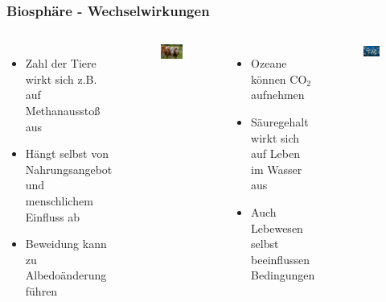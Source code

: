 \begin{frame}
	\frametitle{Biosphäre - Wechselwirkungen}
	\begin{columns}
			\begin{itemize}
				\item Zahl der Tiere wirkt sich z.B. auf Methanausstoß aus
				\item Hängt selbst von Nahrungsangebot und menschlichem Einfluss ab
				\item Beweidung kann zu Albedoänderung führen
			\end{itemize}
			\begin{figure}
				\centering
				\includegraphics[width=\linewidth]{bilder/kuehe}
			\end{figure}
			\begin{itemize}
				\item Ozeane können CO$_2$ aufnehmen
				\item Säuregehalt wirkt sich auf Leben im Wasser aus
				\item Auch Lebewesen selbst beeinflussen Bedingungen
			\end{itemize}
			\begin{figure}
				\centering
				\includegraphics[width=\linewidth]{bilder/plankton}

\end{figure}
\end{columns}
\end{frame}
